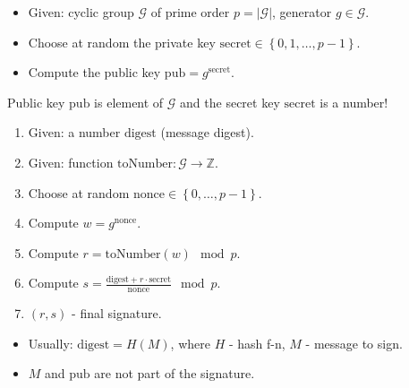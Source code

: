 \begin{frame}
\vskip -0.15cm
\begin{emptyTheorem}
\begin{itemize}

\item Given: cyclic group $\mathcal G$ of prime order $p=|\mathcal G|$, generator $g\in \mathcal G$.
\item Choose at random the private key $\mathrm{secret} \in \left\{0,1,\dots, p-1 \right\}$.
\item Compute the public key $\mathrm{pub} = g^{\mathrm{secret}}$.
\end{itemize}
\end{emptyTheorem}
\vskip -0.15cm


Public key $\mathrm{pub}$ is element of $\mathcal G$ and the secret key $\mathrm{secret}$ is a number! 
\vskip -0.15cm
\begin{emptyTheorem}
\begin{enumerate}
\item Given: a number $\mathrm{digest}$ (message digest). 
\item Given: function $\mathrm{toNumber}:\mathcal G\to \mathbb Z$.
\item Choose at random $\mathrm{nonce} \in \left\{0,\dots, p-1\right\}$.
\item Compute $w= g^{\mathrm{nonce}}$.
\item Compute $ r = \mathrm{toNumber} (w) \mod p $.
\item Compute $s = \frac{\mathrm{digest} + r\cdot \mathrm{secret}}{\mathrm{nonce}} \mod p$.
\item $(r,s)$ - final signature.
\end{enumerate}
\end{emptyTheorem}
\vskip -0.15cm

\begin{itemize}
\item Usually: $\mathrm{digest}= H(M)$, where $H$ - hash f-n, $M$ - message to sign. 
\item $M$ and $\textrm{pub}$ are not part of the signature.
\end{itemize}

\end{frame}

